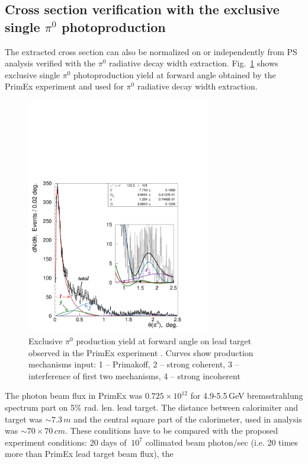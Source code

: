 \subsection{Cross section verification with the exclusive single $\pi^0$ photoproduction   \label{sec:pi0norm} }
The extracted cross section can also be normalized on or independently
from PS analysis verified with the $\pi^0$ radiative decay width
extraction.  Fig.~\ref{fig:leaddndt} shows exclusive single $\pi^0$
photoproduction yield at forward angle obtained by the PrimEx
experiment and used for $\pi^0$ radiative decay width extraction.
\begin{figure}[tpb]
\begin{center}
\includegraphics[width=8cm,angle=0,trim={1.5cm 0.5cm 3.5cm 9.5cm},clip]{figures/dndt_pb_partial.pdf}
\end{center}
\caption{Exclusive $\pi^0$ production yield at forward angle on lead target
observed in the PrimEx experiment \cite{Larin:2010kq}. Curves show production mechanisms input:
1 -- Primakoff, 2 -- strong coherent, 3 -- interference of first two mechanisms, 4 -- strong incoherent}
\label{fig:leaddndt}
\end{figure}
The photon beam flux in PrimEx was $0.725\times10^{12}$ for
4.9-5.5$\,$GeV bremsstrahlung spectrum part on 5\% rad. len. lead
target. The distance between calorimiter and target was $\sim7.3\,m$
and the central square part of the calorimeter, used in analysis was
$\sim70\times70\,cm$. These conditions have to be compared with the
proposed experiment conditions: 20 days of $~10^7$ collimated beam
photon/sec (i.e. 20 times more than PrimEx lead target beam flux), the
